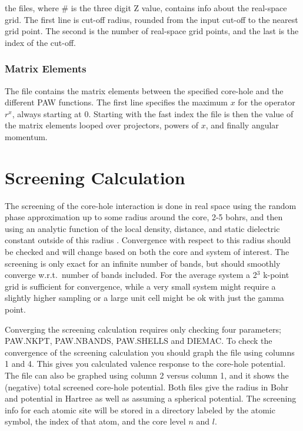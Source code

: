 \documentclass[11pt]{report}
\begin{document}
the  files, where \# is the three digit Z value, contains info about the real-space grid. The first line is cut-off radius, rounded from the input cut-off to the nearest grid point. The second is the number of real-space grid points, and the last is the index of the cut-off.

\subsection{Matrix Elements}

The  file contains the matrix elements between the specified core-hole and the different PAW functions. The first line specifies the maximum $x$ for the operator $r^x$, always starting at 0. Starting with the fast index the file is then the value of the matrix elements looped over projectors, powers of $x$, and finally angular momentum.

\chapter{Screening Calculation}
\label{screening}

The screening of the core-hole interaction is done in real space using the random phase approximation up to 
some radius around the core, 2-5 bohrs, and then using an analytic function of the local density, distance, 
and static dielectric constant outside of this radius \cite{Shirley2006986}. Convergence with respect to this radius should be 
checked and will change based on both the core and system of interest. The screening is only exact for an 
infinite number of bands, but should smoothly converge w.r.t.\ number of bands included. For the average 
system a 2$^3$ k-point grid is sufficient for convergence, while a very small system might require a 
slightly higher sampling or a large unit cell might be ok with just the gamma point.

Converging the screening calculation requires only checking four parameters; PAW.NKPT, PAW.NBANDS, PAW.SHELLS and DIEMAC. To check the convergence of the screening calculation you should graph the file  using columns 1 and 4. This gives you calculated valence response to the core-hole potential. The file  can also be graphed using column 2 versus column 1, and it shows the (negative) total screened core-hole potential. Both files give the radius in Bohr and potential in Hartree as well as assuming a spherical potential. The screening info for each atomic site will be stored in a directory labeled by the atomic symbol, the index of that atom, and the core level $n$ and $l$.
\end{document}
